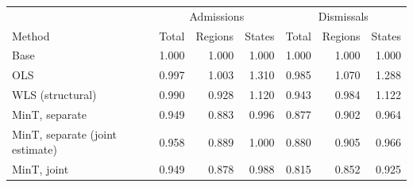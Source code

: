 \centering\small
\begin{tabular}{lrrrrrr}
\hline
 & \multicolumn{3}{c}{Admissions} & \multicolumn{3}{c}{Dismissals} \\
Method & Total & Regions & States & Total & Regions & States \\
\hline
Base & 1.000 & 1.000 & 1.000 & 1.000 & 1.000 & 1.000 \\
OLS & 0.997 & 1.003 & 1.310 & 0.985 & 1.070 & 1.288 \\
WLS (structural) & 0.990 & 0.928 & 1.120 & 0.943 & 0.984 & 1.122 \\
MinT, separate & 0.949 & 0.883 & 0.996 & 0.877 & 0.902 & 0.964 \\
MinT, separate (joint estimate) & 0.958 & 0.889 & 1.000 & 0.880 & 0.905 & 0.966 \\
MinT, joint & 0.949 & 0.878 & 0.988 & 0.815 & 0.852 & 0.925 \\
\hline
\end{tabular}
